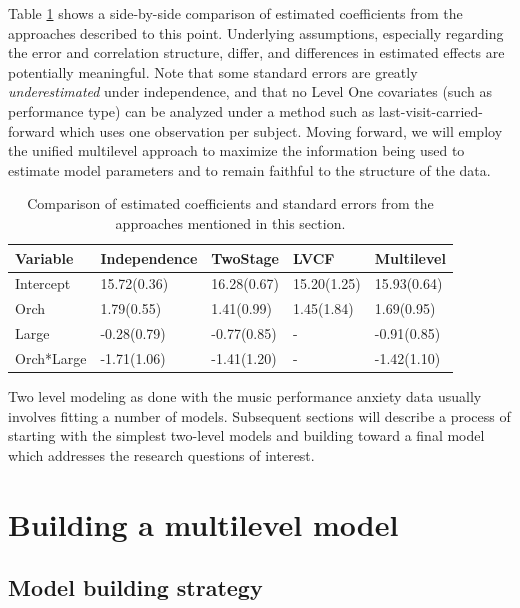 \documentclass[
]{krantz}
\begin{document}
Table \ref{tab:table3chp8} shows a side-by-side comparison of estimated coefficients from the approaches described to this point. Underlying assumptions, especially regarding the error and correlation structure, differ, and differences in estimated effects are potentially meaningful. Note that some standard errors are greatly \emph{underestimated} under independence, and that no Level One covariates (such as performance type) can be analyzed under a method such as last-visit-carried-forward which uses one observation per subject. Moving forward, we will employ the unified multilevel approach to maximize the information being used to estimate model parameters and to remain faithful to the structure of the data.

\begin{table}

\caption{\label{tab:table3chp8}Comparison of estimated coefficients and standard errors from the approaches mentioned in this section.}
\centering
\begin{tabular}[t]{lllll}
\toprule
Variable & Independence & TwoStage & LVCF & Multilevel\\
\midrule
Intercept & 15.72(0.36) & 16.28(0.67) & 15.20(1.25) & 15.93(0.64)\\
Orch & 1.79(0.55) & 1.41(0.99) & 1.45(1.84) & 1.69(0.95)\\
Large & -0.28(0.79) & -0.77(0.85) & - & -0.91(0.85)\\
Orch*Large & -1.71(1.06) & -1.41(1.20) & - & -1.42(1.10)\\
\bottomrule
\end{tabular}
\end{table}

Two level modeling as done with the music performance anxiety data usually involves fitting a number of models. Subsequent sections will describe a process of starting with the simplest two-level models and building toward a final model which addresses the research questions of interest.

\hypertarget{sec:buildmodel}{%
\section{Building a multilevel model}\label{sec:buildmodel}}

\hypertarget{buildstrategy}{%
\subsection{Model building strategy}\label{buildstrategy}}
\end{document}
